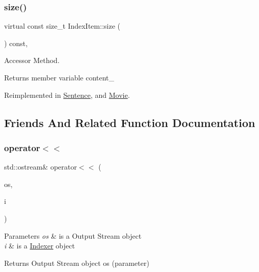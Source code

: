 \mbox{\label{class_index_item_aa910a42ef4f6d7087297ac7fb8cf4a6c}} 
\subsubsection{\texorpdfstring{size()}{size()}}
{\footnotesize\ttfamily virtual const size\+\_\+t Index\+Item\+::size (\begin{DoxyParamCaption}{ }\end{DoxyParamCaption}) const\hspace{0.3cm}{\ttfamily [inline]}, {\ttfamily [virtual]}}



Accessor Method. 

Returns member variable content\+\_\+ 

Reimplemented in \hyperlink{class_sentence_a98d70a10b7573aa295814d1326ed1164}{Sentence}, and \hyperlink{class_movie_ad396ecf97c83fb48c09d2ea6138b430a}{Movie}.



\subsection{Friends And Related Function Documentation}
\mbox{\label{class_index_item_a09373f25959741150437b95f15ae11e2}} 
\subsubsection{\texorpdfstring{operator$<$$<$}{operator<<}}
{\footnotesize\ttfamily std\+::ostream\& operator$<$$<$ (\begin{DoxyParamCaption}\item[{std\+::ostream \&}]{os,  }\item[{const \hyperlink{class_document_indexer}{Document\+Indexer} \&}]{i }\end{DoxyParamCaption})\hspace{0.3cm}{\ttfamily [friend]}}


\begin{DoxyParams}{Parameters}
{\em os} & is a Output Stream object \\
\hline
{\em i} & is a \hyperlink{class_indexer}{Indexer} object \\
\hline
\end{DoxyParams}
\begin{DoxyReturn}{Returns}
Output Stream object os (parameter) 
\end{DoxyReturn}



